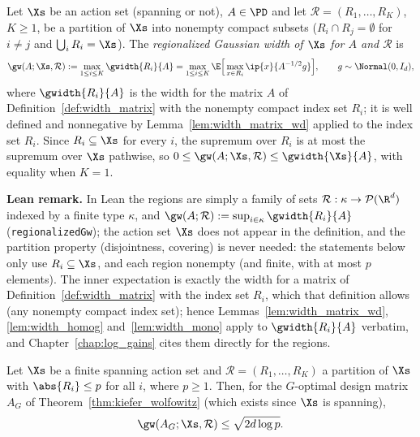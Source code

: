 \begin{definition}\label{def:regionalized_width}
\leanok
{}
Let $\Xs$ be an action set (spanning or not), $A \in \PD$ and let
$\mathcal R = (R_1, \dots, R_K)$, $K \ge 1$, be a partition of
$\Xs$ into nonempty compact subsets ($R_i \cap R_j = \emptyset$ for $i \ne j$ and
$\bigcup_i R_i = \Xs$). The \emph{regionalized Gaussian width of $\Xs$ for $A$ and
$\mathcal R$} is
\[
  \gw(A; \Xs, \mathcal R) := \max_{1 \le i \le K} \gwidth{R_i}{A}
  = \max_{1 \le i \le K}
  \E\Big[\max_{x \in R_i}\ip{x}{A^{-1/2}g}\Big], \qquad g \sim \Normal(0, I_d),
\]
where $\gwidth{R_i}{A}$ is the width for the matrix $A$ of Definition~\ref{def:width_matrix}
with the nonempty compact index set $R_i$; it is well defined and nonnegative by
Lemma~\ref{lem:width_matrix_wd} applied to the index set $R_i$. Since $R_i \subseteq \Xs$ for
every $i$, the supremum over $R_i$ is at most the supremum over $\Xs$ pathwise, so
$0 \le \gw(A;\Xs,\mathcal R) \le \gwidth{\Xs}{A}$, with equality when $K = 1$.
\end{definition}

\textbf{Lean remark.} In Lean the regions are simply a family of sets
$\mathcal R : \kappa \to \mathcal P(\R^d)$ indexed by a finite type $\kappa$, and
$\gw(A;\mathcal R) := \sup_{i \in \kappa}\gwidth{R_i}{A}$ (\texttt{regionalizedGw}); the
action set $\Xs$ does not appear in the definition, and the partition property (disjointness,
covering) is never needed: the statements below only use $R_i \subseteq \Xs$, and each region
nonempty (and finite, with at most $p$ elements). The inner
expectation is exactly the width for a matrix of Definition~\ref{def:width_matrix} with the
index set $R_i$, which that definition allows (any nonempty compact index set); hence
Lemmas~\ref{lem:width_matrix_wd}, \ref{lem:width_homog} and~\ref{lem:width_mono} apply to
$\gwidth{R_i}{A}$ verbatim, and Chapter~\ref{chap:log_gains} cites them directly for the
regions.

\begin{proposition}\label{prop:width_partition}
\leanok
{}
Let $\Xs$ be a finite spanning action set and $\mathcal R = (R_1,\dots,R_K)$ a partition of
$\Xs$ with $\abs{R_i} \le p$ for all $i$, where $p \ge 1$. Then, for the $G$-optimal design
matrix $A_G$ of Theorem~\ref{thm:kiefer_wolfowitz} (which exists since $\Xs$ is spanning),
\[
  \gw(A_G; \Xs, \mathcal R) \le \sqrt{2 d \log p}.
\]
\end{proposition}

